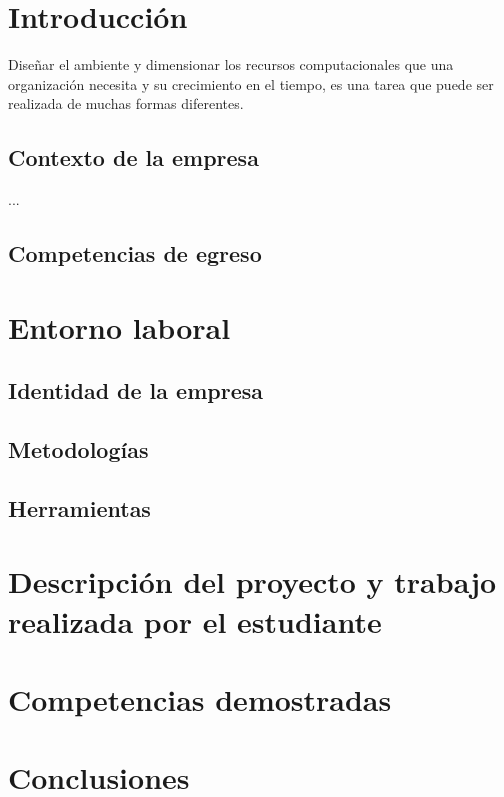 
\section{Introducción}
Diseñar el ambiente y dimensionar los recursos computacionales que una organización necesita y su crecimiento en el tiempo, es una tarea que puede ser realizada de muchas formas diferentes. 
\subsection{Contexto de la empresa}
...

\subsection{Competencias de egreso}

\newpage
\section{Entorno laboral}
\subsection{Identidad de la empresa}
\subsection{Metodologías}
\subsection{Herramientas}

\newpage
\section{Descripción del proyecto y trabajo realizada por el estudiante}


\newpage
\section{Competencias demostradas}


\newpage
\section{Conclusiones}
